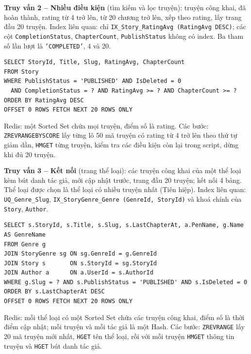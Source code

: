 \textbf{Truy vấn 2 -- Nhiều điều kiện} (tìm kiếm và lọc truyện): truyện công khai, đã hoàn thành, rating từ 4 trở lên, từ 20 chương trở lên, xếp theo rating, lấy trang đầu 20 truyện. Index liên quan: chỉ \texttt{IX\_Story\_RatingAvg (RatingAvg DESC)}; các cột \texttt{CompletionStatus}, \texttt{ChapterCount}, \texttt{PublishStatus} không có index. Ba tham số lần lượt là \texttt{'COMPLETED'}, 4 và 20.
\begin{verbatim}
SELECT StoryId, Title, Slug, RatingAvg, ChapterCount
FROM Story
WHERE PublishStatus = 'PUBLISHED' AND IsDeleted = 0
  AND CompletionStatus = ? AND RatingAvg >= ? AND ChapterCount >= ?
ORDER BY RatingAvg DESC
OFFSET 0 ROWS FETCH NEXT 20 ROWS ONLY
\end{verbatim}
Redis: một Sorted Set chứa mọi truyện, điểm số là rating. Các bước: \texttt{ZREVRANGEBYSCORE} lấy từng lô 50 mã truyện có rating từ 4 trở lên theo thứ tự giảm dần, \texttt{HMGET} từng truyện, kiểm tra các điều kiện còn lại trong script, dừng khi đủ 20 truyện.

\textbf{Truy vấn 3 -- Kết nối} (trang thể loại): các truyện công khai của một thể loại kèm bút danh tác giả, mới cập nhật trước, trang đầu 20 truyện; kết nối 4 bảng. Thể loại được chọn là thể loại có nhiều truyện nhất (Tiên hiệp). Index liên quan: \texttt{UQ\_Genre\_Slug}, \texttt{IX\_StoryGenre\_Genre (GenreId, StoryId)} và khoá chính của \texttt{Story}, \texttt{Author}.
\begin{verbatim}
SELECT s.StoryId, s.Title, s.Slug, s.LastChapterAt, a.PenName, g.Name AS GenreName
FROM Genre g
JOIN StoryGenre sg ON sg.GenreId = g.GenreId
JOIN Story s       ON s.StoryId = sg.StoryId
JOIN Author a      ON a.UserId = s.AuthorId
WHERE g.Slug = ? AND s.PublishStatus = 'PUBLISHED' AND s.IsDeleted = 0
ORDER BY s.LastChapterAt DESC
OFFSET 0 ROWS FETCH NEXT 20 ROWS ONLY
\end{verbatim}
Redis: mỗi thể loại có một Sorted Set chứa các truyện công khai, điểm số là thời điểm cập nhật; mỗi truyện và mỗi tác giả là một Hash. Các bước: \texttt{ZREVRANGE} lấy 20 mã truyện mới nhất, \texttt{HGET} tên thể loại, rồi với mỗi truyện \texttt{HMGET} thông tin truyện và \texttt{HGET} bút danh tác giả.

